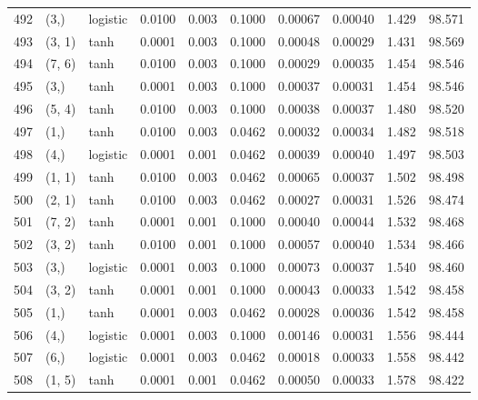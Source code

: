 \begin{tabular}{lllrrrrrrr}
492 &        (3,) &  logistic &  0.0100 &  0.003 &  0.1000 &          0.00067 &    0.00040 &       1.429 &    98.571 \\
493 &      (3, 1) &      tanh &  0.0001 &  0.003 &  0.1000 &          0.00048 &    0.00029 &       1.431 &    98.569 \\
494 &      (7, 6) &      tanh &  0.0100 &  0.003 &  0.1000 &          0.00029 &    0.00035 &       1.454 &    98.546 \\
495 &        (3,) &      tanh &  0.0001 &  0.003 &  0.1000 &          0.00037 &    0.00031 &       1.454 &    98.546 \\
496 &      (5, 4) &      tanh &  0.0100 &  0.003 &  0.1000 &          0.00038 &    0.00037 &       1.480 &    98.520 \\
497 &        (1,) &      tanh &  0.0100 &  0.003 &  0.0462 &          0.00032 &    0.00034 &       1.482 &    98.518 \\
498 &        (4,) &  logistic &  0.0001 &  0.001 &  0.0462 &          0.00039 &    0.00040 &       1.497 &    98.503 \\
499 &      (1, 1) &      tanh &  0.0100 &  0.003 &  0.0462 &          0.00065 &    0.00037 &       1.502 &    98.498 \\
500 &      (2, 1) &      tanh &  0.0100 &  0.003 &  0.0462 &          0.00027 &    0.00031 &       1.526 &    98.474 \\
501 &      (7, 2) &      tanh &  0.0001 &  0.001 &  0.1000 &          0.00040 &    0.00044 &       1.532 &    98.468 \\
502 &      (3, 2) &      tanh &  0.0100 &  0.001 &  0.1000 &          0.00057 &    0.00040 &       1.534 &    98.466 \\
503 &        (3,) &  logistic &  0.0001 &  0.003 &  0.1000 &          0.00073 &    0.00037 &       1.540 &    98.460 \\
504 &      (3, 2) &      tanh &  0.0001 &  0.001 &  0.1000 &          0.00043 &    0.00033 &       1.542 &    98.458 \\
505 &        (1,) &      tanh &  0.0001 &  0.003 &  0.0462 &          0.00028 &    0.00036 &       1.542 &    98.458 \\
506 &        (4,) &  logistic &  0.0001 &  0.003 &  0.1000 &          0.00146 &    0.00031 &       1.556 &    98.444 \\
507 &        (6,) &  logistic &  0.0001 &  0.003 &  0.0462 &          0.00018 &    0.00033 &       1.558 &    98.442 \\
508 &      (1, 5) &      tanh &  0.0001 &  0.001 &  0.0462 &          0.00050 &    0.00033 &       1.578 &    98.422 \\

\end{tabular}
